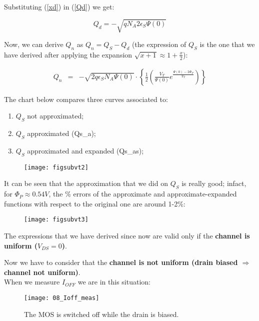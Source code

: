 \documentclass[a4paper, 12pt, twoside, openright]{report}
\begin{document}
Substituting (\ref{xd}) in (\ref{Qd}) we get:

\begin{equation}
Q_d = -\sqrt{q N_A 2 \epsilon_S \Psi(0)}
\label{}
\end{equation}

Now, we can derive $Q_{n}$ as $Q_n = Q_S - Q_d$ (the expression of $Q_{S}$ is the one that we have derived after applying the expansion $\sqrt{x+1} \approx 1+ \frac{x}{2}$):

  \begin{eqnarray*}
      Q_n &=&-\sqrt{2q \epsilon_S N_A \Psi(0)} \cdot \left\{\frac{1}{2}\left( \frac{V_T}{\Psi(0)} e^{\displaystyle 			\frac{\Psi(0)-2\Phi_P}{V_T}}\right) \right\}
  \end{eqnarray*}

The chart below compares three curves associated to:

\begin{enumerate}
\item $Q_{S}$ not approximated;
\item $Q_{S}$ approximated (Qs\_a);
\item $Q_{S}$ approximated and expanded (Qs\_as);
\end{enumerate}

	\begin{figure}[H]
	\centering
	\texttt{[image: figsubvt2]}
	\caption{}
	\label{}
	\end{figure}

It can be seen that the approximation that we did on $Q_{S}$ is really good; infact, for $\Phi_P \approx 0.54 V$, the \% errors of the approximate and approximate-expanded functions with respect to the original one are around 1-2\%:

	\begin{figure}[H]
	\centering
	\texttt{[image: figsubvt3]}
	\caption{}
	\label{}
	\end{figure}

The expressions that we have derived since now are valid only if the \textbf{channel is uniform ($V_{DS} = 0$)}.

Now we have to consider that the \textbf{channel is not uniform (drain biased $\Rightarrow$ channel not uniform)}.\\
When we measure $I_{OFF}$ we are in this situation:

	\begin{figure}[H]
	\centering
	\texttt{[image: 08\_Ioff\_meas]}
	\caption{The MOS is switched off while the drain is biased.}
	\label{}
	\end{figure}
\end{document}
